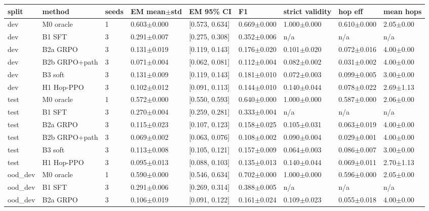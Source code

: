 \begin{tabular}{lllllllll}
\toprule
split & method & seeds & EM mean$\pm$std & EM 95\% CI & F1 & strict validity & hop eff & mean hops \\
\midrule
dev & M0 oracle & 1 & 0.603$\pm$0.000 & [0.573, 0.634] & 0.669$\pm$0.000 & 1.000$\pm$0.000 & 0.610$\pm$0.000 & 2.05$\pm$0.00 \\
dev & B1 SFT & 3 & 0.291$\pm$0.007 & [0.275, 0.308] & 0.352$\pm$0.006 & n/a & n/a & n/a \\
dev & B2a GRPO & 3 & 0.131$\pm$0.019 & [0.119, 0.143] & 0.176$\pm$0.020 & 0.101$\pm$0.020 & 0.072$\pm$0.016 & 4.00$\pm$0.00 \\
dev & B2b GRPO+path & 3 & 0.071$\pm$0.004 & [0.062, 0.081] & 0.112$\pm$0.004 & 0.082$\pm$0.002 & 0.031$\pm$0.002 & 4.00$\pm$0.00 \\
dev & B3 soft & 3 & 0.131$\pm$0.009 & [0.119, 0.143] & 0.181$\pm$0.010 & 0.072$\pm$0.003 & 0.099$\pm$0.005 & 3.00$\pm$0.00 \\
dev & H1 Hop-PPO & 3 & 0.102$\pm$0.012 & [0.091, 0.113] & 0.144$\pm$0.010 & 0.140$\pm$0.044 & 0.078$\pm$0.022 & 2.69$\pm$1.13 \\
test & M0 oracle & 1 & 0.572$\pm$0.000 & [0.550, 0.593] & 0.640$\pm$0.000 & 1.000$\pm$0.000 & 0.587$\pm$0.000 & 2.06$\pm$0.00 \\
test & B1 SFT & 3 & 0.270$\pm$0.004 & [0.259, 0.281] & 0.333$\pm$0.004 & n/a & n/a & n/a \\
test & B2a GRPO & 3 & 0.115$\pm$0.023 & [0.107, 0.123] & 0.158$\pm$0.025 & 0.105$\pm$0.031 & 0.063$\pm$0.019 & 4.00$\pm$0.00 \\
test & B2b GRPO+path & 3 & 0.069$\pm$0.002 & [0.063, 0.076] & 0.108$\pm$0.002 & 0.090$\pm$0.004 & 0.029$\pm$0.001 & 4.00$\pm$0.00 \\
test & B3 soft & 3 & 0.113$\pm$0.008 & [0.105, 0.121] & 0.157$\pm$0.009 & 0.064$\pm$0.003 & 0.086$\pm$0.007 & 3.00$\pm$0.00 \\
test & H1 Hop-PPO & 3 & 0.095$\pm$0.013 & [0.088, 0.103] & 0.135$\pm$0.013 & 0.140$\pm$0.044 & 0.069$\pm$0.011 & 2.70$\pm$1.13 \\
ood\_dev & M0 oracle & 1 & 0.590$\pm$0.000 & [0.546, 0.634] & 0.702$\pm$0.000 & 1.000$\pm$0.000 & 0.596$\pm$0.000 & 2.05$\pm$0.00 \\
ood\_dev & B1 SFT & 3 & 0.291$\pm$0.006 & [0.269, 0.314] & 0.388$\pm$0.005 & n/a & n/a & n/a \\
ood\_dev & B2a GRPO & 3 & 0.106$\pm$0.019 & [0.091, 0.122] & 0.161$\pm$0.024 & 0.109$\pm$0.023 & 0.055$\pm$0.018 & 4.00$\pm$0.00 \\

\end{tabular}
